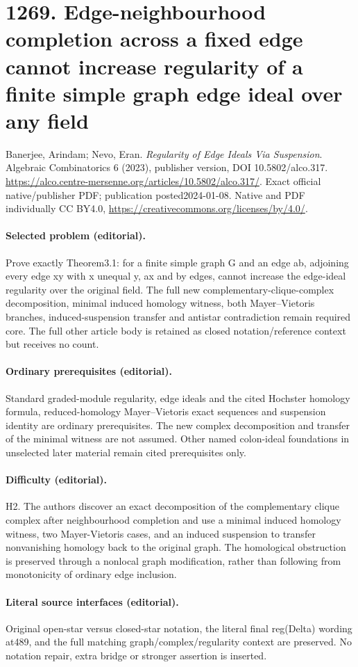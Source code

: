 \documentclass[10pt]{article}
\theoremstyle{definition}
\numberwithin{equation}{section}
\begin{document}
\section*{1269. Edge-neighbourhood completion across a fixed edge cannot increase regularity of a finite simple graph edge ideal over any field}
Banerjee, Arindam; Nevo, Eran. \emph{Regularity of Edge Ideals Via Suspension}. Algebraic Combinatorics 6 (2023), publisher version, DOI 10.5802/alco.317. \url{https://alco.centre-mersenne.org/articles/10.5802/alco.317/}. Exact official native/publisher PDF; publication posted2024-01-08. Native and PDF individually CC BY4.0, \url{https://creativecommons.org/licenses/by/4.0/}.
\paragraph{Selected problem (editorial).} Prove exactly Theorem3.1: for a finite simple graph G and an edge ab, adjoining every edge xy with x unequal y, ax and by edges, cannot increase the edge-ideal regularity over the original field. The full new complementary-clique-complex decomposition, minimal induced homology witness, both Mayer--Vietoris branches, induced-suspension transfer and antistar contradiction remain required core. The full other article body is retained as closed notation/reference context but receives no count.
\paragraph{Ordinary prerequisites (editorial).} Standard graded-module regularity, edge ideals and the cited Hochster homology formula, reduced-homology Mayer--Vietoris exact sequences and suspension identity are ordinary prerequisites. The new complex decomposition and transfer of the minimal witness are not assumed. Other named colon-ideal foundations in unselected later material remain cited prerequisites only.
\paragraph{Difficulty (editorial).} H2. The authors discover an exact decomposition of the complementary clique complex after neighbourhood completion and use a minimal induced homology witness, two Mayer-Vietoris cases, and an induced suspension to transfer nonvanishing homology back to the original graph. The homological obstruction is preserved through a nonlocal graph modification, rather than following from monotonicity of ordinary edge inclusion.
\paragraph{Literal source interfaces (editorial).} Original open-star versus closed-star notation, the literal final reg(Delta) wording at489, and the full matching graph/complex/regularity context are preserved. No notation repair, extra bridge or stronger assertion is inserted.
\end{document}
